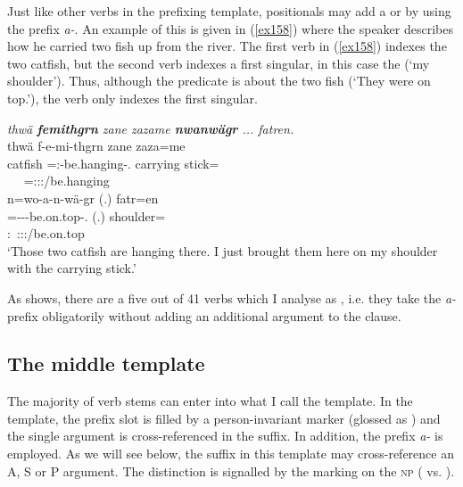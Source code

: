 Just like other verbs in the prefixing template, positionals may add a  or  by using the  prefix \emph{a-}. An example of this is given in (\ref{ex158}) where the speaker describes how he carried two fish up from the river. The first verb in (\ref{ex158}) indexes the two catfish, but the second verb indexes a first singular, in this case the  (`my shoulder'). Thus, although the predicate is about the two fish (`They were on top.'), the verb only indexes the first singular.

\begin{exe}
	\ex \emph{thwä \textbf{femithgrn} zane zazame \textbf{nwanwägr} ... fatren.}\\
	\glll thwä f-e-mi-thgrn zane {zaza=me}\\
	catfish \Dist=\Stnsg{}:\Alph-be.hanging-\Stat.\Du{} \Prox{} {carrying stick}=\Ins{}\\
	~ {\Dist~=\Stdu:\Sbj:\Nonpast:\Stat/be.hanging} ~ ~\\
	\sn
	\glll n=wo-a-n-wä-gr (.) fatr=en\\
	\Immpst=\Fsg-\Vc-\Venit-be.on.top-\Stat.\Ndu{} (.) shoulder=\Loc\\
	\footnotesize{\Fsg:\Io~:\Immpst:\Stat:\Venit/be.on.top} ~ ~\\
	\trans `Those two catfish are hanging there. I just brought them here on my shoulder with the carrying stick.' 
	\label{ex158}
\end{exe}

As  shows, there are a five out of 41  verbs which I analyse as , i.e. they take the \emph{a-} prefix obligatorily without adding an additional argument to the clause.

\subsection{The middle template} \label{middletemplatesubsection}

The majority of verb stems can enter into what I call the  template. In the  template, the prefix slot is filled by a person-invariant  marker (glossed as \M{}) and the single argument is cross-referenced in the suffix. In addition, the  prefix \emph{a-} is employed. As we will see below, the suffix in this template may cross-reference an A, S or P argument. The distinction is signalled by the  marking on the \textsc{np} ( vs. ).%

